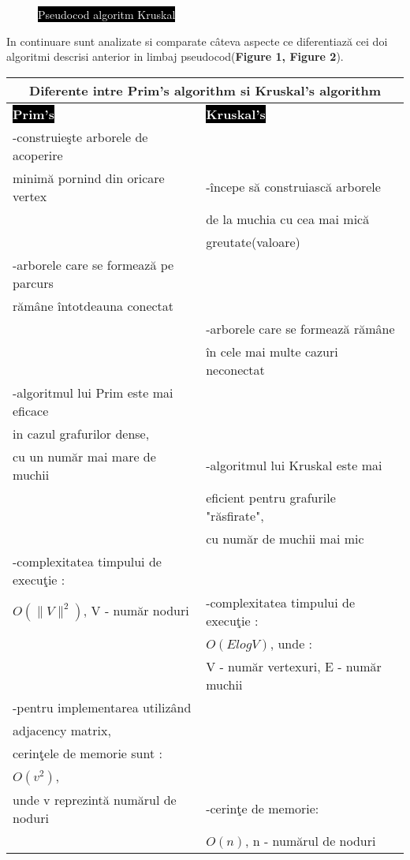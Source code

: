 \documentclass[14pt]{article}
\begin{document}
\begin{figure}[h]
\begin{center}
\begin{tabbing}
\vspace{20mm}

\end{tabbing}
\caption{\colorbox{black}{\textcolor{white}{Pseudocod algoritm Kruskal}}}
\end{center}
\end{figure}

\newpage

In continuare sunt analizate si comparate c\^ateva aspecte ce diferentiaz\u{a} cei doi algoritmi descrisi anterior in limbaj pseudocod(\textbf{Figure 1, Figure 2}).

\vspace{7mm}

\begin{center} 
\begin{tabular}{|l|l|}
\hline \multicolumn{2}{|c|}{\textbf{Diferente intre Prim's algorithm si Kruskal's algorithm}}\\
\hline
\textbf{\colorbox{black}{\textcolor{white}{Prim's}}} & \textbf{\colorbox{black}{\textcolor{white}{Kruskal's}}}\\
\hline
-construie\c ste arborele de acoperire\\ minim\u{a} pornind din oricare vertex & -\^incepe s\u{a} construiasc\u{a} arborele\\& de la  muchia cu cea mai mic\u{a}\\& greutate(valoare) \\ -arborele care se formeaz\u{a} pe parcurs\\ r\u{a}m\^ane \^intotdeauna conectat \\& -arborele care se formeaz\u{a} r\u{a}m\^ane \\& \^in cele mai multe cazuri neconectat \\  -algoritmul lui Prim este mai eficace\\ in cazul grafurilor dense,\\ cu un num\u{a}r mai mare de muchii & -algoritmul lui Kruskal este mai\\& eficient pentru grafurile "r\u{a}sfirate",\\& cu num\u{a}r de muchii mai mic \\ -complexitatea timpului de execu\c tie :\\ $O(\|V\|^2)$,  V - num\u{a}r noduri & -complexitatea timpului de execu\c tie :\\& $O(ElogV)$, unde :\\& V - num\u{a}r vertexuri, E - num\u{a}r muchii \\ -pentru implementarea utiliz\^and\\ adjacency matrix,\\ cerin\c tele de memorie sunt :\\ $O(v^2)$, \\unde v reprezint\u{a} num\u{a}rul de noduri &  -cerin\c te de memorie:\\& $O(n)$,  n - num\u{a}rul de noduri\\
\hline
\end{tabular} \end{center} 
\vspace{5mm}
\end{document}
